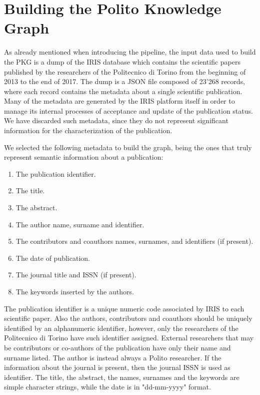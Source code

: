 \documentclass[%
    corpo=13.5pt,
    twoside,
    oldstyle,
    tipotesi=magistrale,
    greek,
    evenboxes
]{toptesi}
\begin{document}
\section{Building the Polito Knowledge Graph}
\label{sec:buildingpkg}

As already mentioned when introducing the pipeline, the input data used to
build the PKG is a dump of the IRIS database which contains the
scientific papers published by the researchers of the Politecnico di
Torino from the beginning of 2013 to the end of 2017.
The dump is a JSON file composed of 23'268 records, where each record contains
the metadata about a single scientific publication.
Many of the metadata are generated by the IRIS platform itself in
order to manage its internal processes of acceptance and update of the
publication status. We have discarded such metadata, since they do not
represent significant information for the characterization of the publication.

We selected the following metadata to build the graph, being the ones that
truly represent semantic information about a publication:

\begin{enumerate}
    \item The publication identifier.
    \item The title.
    \item The abstract.
    \item The author name, surname and identifier.
    \item The contributors and coauthors names, surnames, and identifiers
        (if present).
    \item The date of publication.
    \item The journal title and ISSN (if present).
    \item The keywords inserted by the authors.
\end{enumerate}

The publication identifier is a unique numeric code associated by IRIS to each
scientific paper. Also the authors, contributors and coauthors should be
uniquely identified by an alphanumeric identifier, however, only the researchers
of the Politecnico di Torino have such identifier assigned. External
researchers that may be contributors or co-authors of the publication have only
their name and surname listed. The author is instead always a Polito researcher.
If the information about the journal is present, then the journal ISSN is
used as identifier.
The title, the abstract, the names, surnames and the keywords are simple
character strings, while the date is in "dd-mm-yyyy" format.
\end{document}
